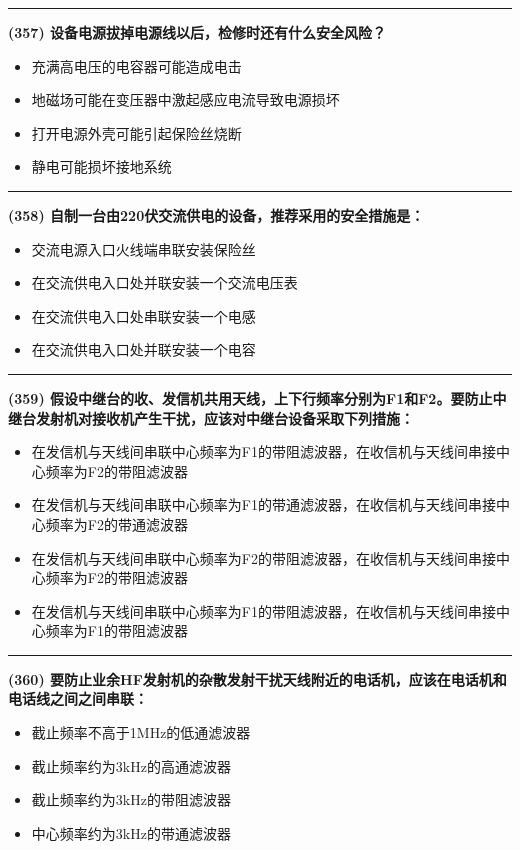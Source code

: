 \documentclass[twocolumn]{ctexart}  %
\begin{document}
\noindent\rule{0.5\textwidth}{1pt}
\heiti \textbf{(357) 设备电源拔掉电源线以后，检修时还有什么安全风险？} \songti {\color{gray} [LK1233] }
\begin{itemize}
	\item  充满高电压的电容器可能造成电击
	\item  地磁场可能在变压器中激起感应电流导致电源损坏
	\item  打开电源外壳可能引起保险丝烧断
	\item  静电可能损坏接地系统
\end{itemize}


\noindent\rule{0.5\textwidth}{1pt}
\heiti \textbf{(358) 自制一台由220伏交流供电的设备，推荐采用的安全措施是：} \songti {\color{gray} [LK1234] }
\begin{itemize}
	\item  交流电源入口火线端串联安装保险丝
	\item  在交流供电入口处并联安装一个交流电压表
	\item  在交流供电入口处串联安装一个电感
	\item  在交流供电入口处并联安装一个电容
\end{itemize}


\noindent\rule{0.5\textwidth}{1pt}
\heiti \textbf{(359) 假设中继台的收、发信机共用天线，上下行频率分别为F1和F2。要防止中继台发射机对接收机产生干扰，应该对中继台设备采取下列措施：} \songti {\color{gray} [LK0574] }
\begin{itemize}
	\item  在发信机与天线间串联中心频率为F1的带阻滤波器，在收信机与天线间串接中心频率为F2的带阻滤波器
	\item  在发信机与天线间串联中心频率为F1的带通滤波器，在收信机与天线间串接中心频率为F2的带通滤波器
	\item  在发信机与天线间串联中心频率为F2的带阻滤波器，在收信机与天线间串接中心频率为F2的带阻滤波器
	\item  在发信机与天线间串联中心频率为F1的带阻滤波器，在收信机与天线间串接中心频率为F1的带阻滤波器
\end{itemize}


\noindent\rule{0.5\textwidth}{1pt}
\heiti \textbf{(360) 要防止业余HF发射机的杂散发射干扰天线附近的电话机，应该在电话机和电话线之间之间串联：} \songti {\color{gray} [LK0575] }
\begin{itemize}
	\item  截止频率不高于1MHz的低通滤波器
	\item  截止频率约为3kHz的高通滤波器
	\item  截止频率约为3kHz的带阻滤波器
	\item  中心频率约为3kHz的带通滤波器
\end{itemize}
\end{document}
